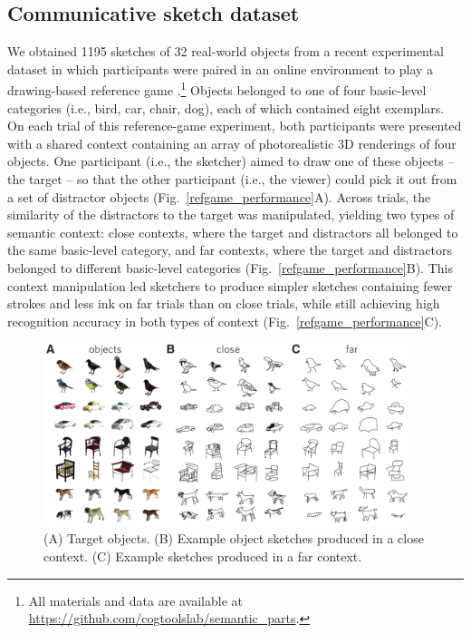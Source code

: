 \documentclass[10pt,letterpaper]{article}
\begin{document}
\subsection{Communicative sketch dataset}
We obtained 1195 sketches of 32 real-world objects from a recent experimental dataset in which participants were paired in an online environment to play a drawing-based reference game \cite{fan2018modeling}.\footnote{All materials and data are available at \url{https://github.com/cogtoolslab/semantic_parts}.}
Objects belonged to one of four basic-level categories (i.e., bird, car, chair, dog), each of which contained eight exemplars. %
On each trial of this reference-game experiment, both participants were presented with a shared context containing an array of photorealistic 3D renderings of four objects.   
One participant (i.e., the sketcher) aimed to draw one of these objects -- the target -- so that the other participant (i.e., the viewer) could pick it out from a set of distractor objects (Fig.~\ref{refgame_performance}A). 
Across trials, the similarity of the distractors to the target was manipulated, yielding two types of semantic context: close contexts, where the target and distractors all belonged to the same basic-level category, and far contexts, where the target and distractors belonged to different basic-level categories (Fig.~\ref{refgame_performance}B). 
This context manipulation led sketchers to produce simpler sketches containing fewer strokes and less ink on far trials than on close trials, while still achieving high recognition accuracy in both types of context (Fig.~\ref{refgame_performance}C). %
 
\begin{figure}
\centering
\includegraphics[width=0.95\textwidth]{figures/refgame_gallery.pdf}
\caption{(A) Target objects. (B) Example object sketches produced in a close context. (C) Example sketches produced in a far context.}
\label{refgame_gallery}
\end{figure}
\end{document}
